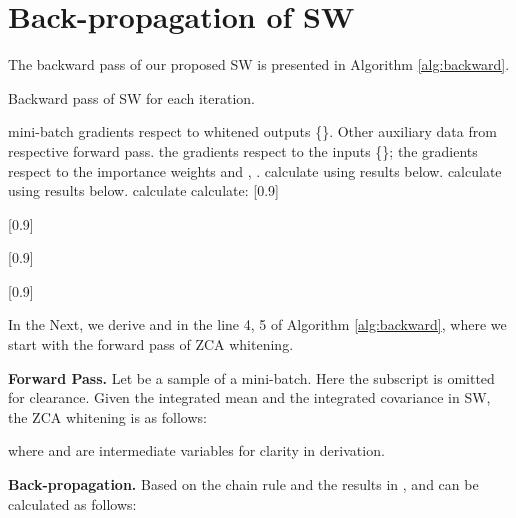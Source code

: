 \documentclass[10pt,twocolumn,letterpaper]{article}
\begin{document}
\section{Back-propagation of SW}

The backward pass of our proposed SW is presented in Algorithm \ref{alg:backward}.
\vspace{-8pt}
\begin{algorithm}[h]
	\caption{Backward pass of SW for each iteration.}
	\label{alg:backward}
	{\fontsize{9}{9} \selectfont
		\begin{algorithmic}[1]
			 mini-batch gradients respect to whitened outputs \{\scalebox{0.9}{}\}. Other auxiliary data from respective forward pass.
 the gradients respect to the inputs \{\scalebox{0.9}{}\};
			the gradients respect to the importance weights \scalebox{0.9}{} and \scalebox{0.9}{}, \scalebox{0.9}{}.
			\State calculate \scalebox{0.9}{} using results below.
\State calculate \scalebox{0.9}{} using results below.
\EndFor
			\State calculate \scalebox{0.9}{
				
			}
			\scalebox{0.9}{
				
			}
\EndFor
			\State calculate: \linebreak
			\scalebox{0.85}[0.9]{
				
			}
			\scalebox{0.85}[0.9]{
				
			}
			\scalebox{0.82}[0.9]{
				
			}\footnotemark \linebreak
			\scalebox{0.82}[0.9]{
				
			}
		\end{algorithmic}
	}
\end{algorithm}
\vspace{-8pt}


In the Next, we derive  and  in the line 4, 5 of Algorithm \ref{alg:backward}, where we start with the forward pass of ZCA whitening.

\noindent\textbf{Forward Pass.}
Let  be a sample of a mini-batch.
Here the subscript  is omitted for clearance.
Given the integrated mean  and the integrated covariance  in SW, the ZCA whitening is as follows:

where  and  are intermediate variables for clarity in derivation.

\noindent\textbf{Back-propagation.}
Based on the chain rule and the results in \cite{ionescu2015training,lei2018decorrelated},  and  can be calculated as follows:
\end{document}
